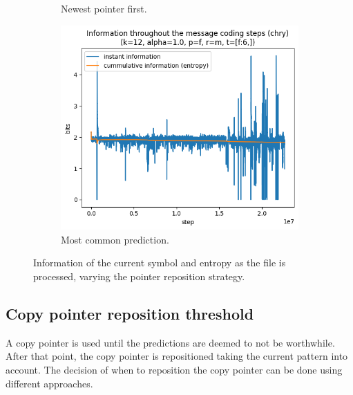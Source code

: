 \documentclass{article}
\begin{document}
\begin{figure}
\begin{subfigure}[b]{0.3\textwidth}
\begin{center}
        \end{center}
        \caption{Newest pointer first.}
        \label{fig:results-reposition-o}
    \end{subfigure}
    \hfill
    \begin{subfigure}[b]{0.3\textwidth}
        \begin{center}
            \includegraphics[width=1.0\linewidth]{../scripts/images/chry_12_1.0_f_m_[f:6,].png}
        \end{center}
        \caption{Most common prediction.}
        \label{fig:results-reposition-m}
    \end{subfigure}
    \caption{Information of the current symbol and entropy as the file is processed, varying the pointer reposition strategy.}
    \label{fig:results-reposition}
\end{figure}

\subsection{Copy pointer reposition threshold}

A copy pointer is used until the predictions are deemed to not be worthwhile.
After that point, the copy pointer is repositioned taking the current pattern into account.
The decision of when to reposition the copy pointer can be done using different approaches.
\end{document}
